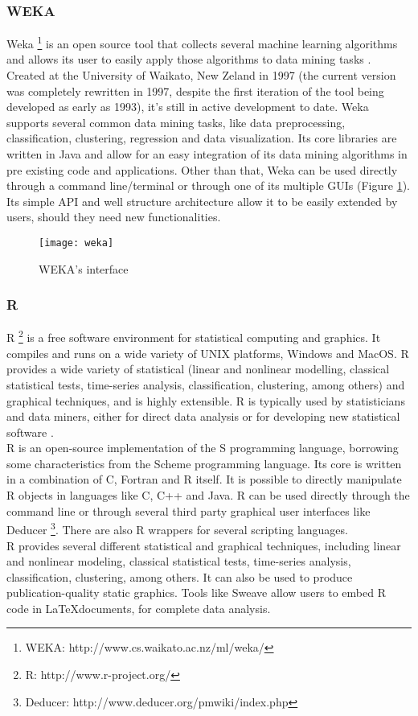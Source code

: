 \subsubsection{WEKA}
Weka \footnote{WEKA: http://www.cs.waikato.ac.nz/ml/weka/} is an open source tool that collects several machine learning algorithms and allows its user to easily apply those algorithms to data mining tasks \cite{han2006data}. Created at the University of Waikato, New Zeland in 1997 (the current version was completely rewritten in 1997, despite the first iteration of the tool being developed as early as 1993), it’s still in active development to date. Weka supports several common data mining tasks, like data preprocessing, classification, clustering, regression and data visualization. Its core libraries are written in Java and allow for an easy integration of its data mining algorithms in pre existing code and applications. Other than that, Weka can be used directly through a command line/terminal or through one of its multiple GUIs (Figure \ref{fig:weka}). Its simple API and well structure architecture allow it to be easily extended by users, should they need new functionalities.

\begin{figure}[htb]
  \begin{center}
    \leavevmode
    \texttt{[image: weka]}
	\caption{WEKA's interface}
    \label{fig:weka}
  \end{center}
\end{figure}

\subsubsection{R}
R \footnote{R: http://www.r-project.org/} is a free software environment for statistical computing and graphics. It compiles and runs on a wide variety of UNIX platforms, Windows and MacOS. R provides a wide variety of statistical (linear and nonlinear modelling, classical statistical tests, time-series analysis, classification, clustering, among others) and graphical techniques, and is highly extensible.  R is typically used by statisticians and data miners, either for direct data analysis or for developing new statistical software \cite{fox2005using}.\\
R is an open-source implementation of the S programming language, borrowing some characteristics from the Scheme programming language. Its core is written in a combination of C, Fortran and R itself. It is possible to directly manipulate R objects in languages like C, C++ and Java. R can be used directly through the command line or through several third party graphical user interfaces like Deducer \footnote{Deducer: http://www.deducer.org/pmwiki/index.php}. There are also R wrappers for several scripting languages.\\
R provides several different statistical and graphical techniques, including linear and nonlinear modeling, classical statistical tests, time-series analysis, classification, clustering, among others. It can also be used to produce publication-quality static graphics. Tools like Sweave \cite{leisch2002sweave} allow users to embed R code in \LaTeX documents, for complete data analysis.

